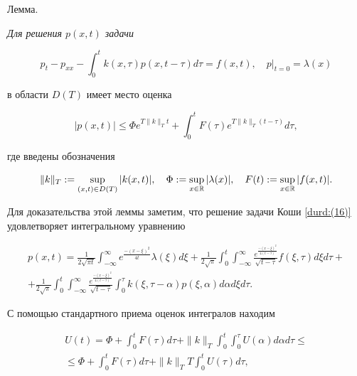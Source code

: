 \smallskip

{\small\sc Лемма.} {\it Для решения $p(x,t)$ задачи 

\begin{equation}

\label{durd:(16)}

p_{t}-p_{xx}-\int^{t}_{0}k(x,\tau)p(x,t-\tau)d\tau=f(x,t), \quad  p\big|_{t=0}=\lambda(x) 

\end{equation}

в области $D(T)$ имеет место оценка

\begin{equation}

\label{durd:(17)}

|p(x,t)|\leq\Phi{e^{T\|k\|_{T}t}}+\int^{t}_{0}F(\tau)e^{T\|k\|_{T}(t-\tau)}d\tau, 

\end{equation}

где введены обозначения

$$\|k\|_{T}:=\sup_{(x,t)\in D(T)}|k(x,t)|, \quad  \Phi:=\sup_{x\in {\Bbb R}}|\lambda(x)|, \quad  F(t):=\sup_{x\in {\Bbb R}}|f(x,t)|.$$}



\smallskip



Для доказательства этой леммы заметим, что  решение задачи Коши \eqref{durd:(16)} удовлетворяет интегральному уравнению

\begin{multline}

p(x,t)=\frac{1}{2\sqrt{\pi{t}}}\int^{\infty}_{-\infty}e^{\frac{-(x-\xi)^{2}}{4t}}\lambda(\xi)d\xi+\frac{1}{2\sqrt{\pi}}\int^{t}_{0}\int^{\infty}_{-\infty}\frac{e^{\frac{-(x-\xi)^{2}}{4(t-\tau)}}}{\sqrt{t-\tau}}f(\xi,\tau)d\xi{d\tau}+

\\

+\frac{1}{2\sqrt{\pi}}\int^{t}_{0}\int^{\infty}_{-\infty}\frac{e^{\frac{-(x-\xi)^{2}}{4(t-\tau)}}}

{\sqrt{t-\tau}}\int^{\tau}_{0}k(\xi,\tau-\alpha)p(\xi,\alpha)d\alpha{d\xi}d\tau.

\end{multline}



С помощью стандартного приема оценок интегралов находим

\begin{multline}

U(t)=\Phi+\int^{t}_{0}F(\tau)d\tau+\|k\|_{T}\int^{t}_{0}\int^{\tau}_{0}

U(\alpha)d\alpha{d\tau}\leq

\\

\leq

\Phi+\int^{t}_{0}F(\tau)d\tau+\|k\|_{T}T\int^{t}_{0}U(\tau)d\tau,

\end{multline}

